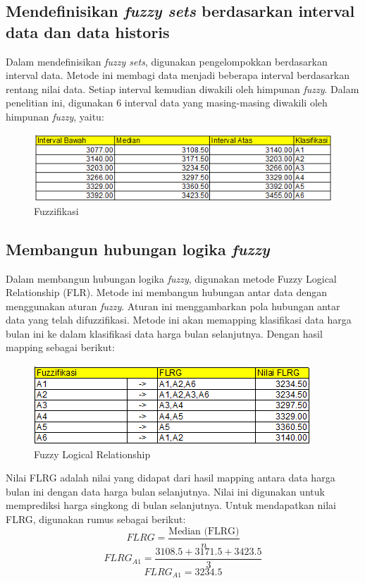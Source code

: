 \documentclass[conference]{IEEEtran}
\begin{document}
\subsection{Mendefinisikan \textit{fuzzy sets} berdasarkan interval data dan data historis}
Dalam mendefinisikan \textit{fuzzy sets}, digunakan pengelompokkan berdasarkan interval data. Metode ini membagi data menjadi beberapa interval berdasarkan rentang nilai data. Setiap interval kemudian diwakili oleh himpunan \textit{fuzzy}. Dalam penelitian ini, digunakan 6 interval data yang masing-masing diwakili oleh himpunan \textit{fuzzy}, yaitu:
\begin{figure}[H]
    \centering
    \includegraphics[scale=0.7]{images/Fuzzifikasi.png} 
    \caption{Fuzzifikasi}
\end{figure}

\subsection{Membangun hubungan logika \textit{fuzzy}}
Dalam membangun hubungan logika \textit{fuzzy}, digunakan metode Fuzzy Logical Relationship (FLR). Metode ini membangun hubungan antar data dengan menggunakan aturan \textit{fuzzy}. Aturan ini menggambarkan pola hubungan antar data yang telah difuzzifikasi. Metode ini akan memapping klasifikasi data harga bulan ini ke dalam klasifikasi data harga bulan selanjutnya. Dengan hasil mapping sebagai berikut:
\begin{figure}[H]
    \centering
    \includegraphics[scale=0.7]{images/FLR.png} 
    \caption{Fuzzy Logical Relationship}
\end{figure}
Nilai FLRG adalah nilai yang didapat dari hasil mapping antara data harga bulan ini dengan data harga bulan selanjutnya. Nilai ini digunakan untuk memprediksi harga singkong di bulan selanjutnya.
Untuk mendapatkan nilai FLRG, digunakan rumus sebagai berikut:
    \begin{equation}
        FLRG = \frac{\text{Median (FLRG)}}{n}
    \end{equation}
    \begin{equation*}
        FLRG_{A1} = \frac{3108.5 + 3171.5 + 3423.5}{3}
    \end{equation*}
    \begin{equation*}
        FLRG_{A1} = 3234.5
    \end{equation*}
   
\end{document}
